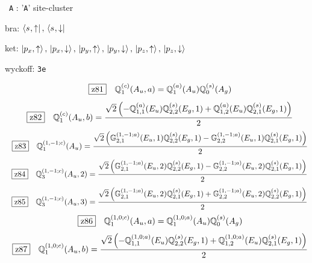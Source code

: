 \documentclass[fleqn,10pt,landscape]{jsarticle}
\begin{document}
\noindent\textbullet\, \texttt{A} : '\texttt{A}' site-cluster

\noindent\quad * bra: $\bra{s_{},\uparrow},\, \bra{s_{},\downarrow}$

\noindent\quad * ket: $\ket{p_{x},\uparrow},\, \ket{p_{x},\downarrow},\, \ket{p_{y},\uparrow},\, \ket{p_{y},\downarrow},\, \ket{p_{z},\uparrow},\, \ket{p_{z},\downarrow}$

\noindent\quad * wyckoff: \texttt{3e}

\begin{dmath*}
\hspace*{3mm}\fbox{z81}\quad \mathbb{Q}_{1}^{(c)}(A_{u},a)=\mathbb{Q}_{1}^{(a)}(A_{u}) \mathbb{Q}_{0}^{(s)}(A_{g})
\end{dmath*}
\begin{dmath*}
\hspace*{3mm}\fbox{z82}\quad \mathbb{Q}_{1}^{(c)}(A_{u},b)=\frac{\sqrt{2} \left(- \mathbb{Q}_{1,1}^{(a)}(E_{u}) \mathbb{Q}_{2,2}^{(s)}(E_{g},1) + \mathbb{Q}_{1,2}^{(a)}(E_{u}) \mathbb{Q}_{2,1}^{(s)}(E_{g},1)\right)}{2}
\end{dmath*}
\begin{dmath*}
\hspace*{3mm}\fbox{z83}\quad \mathbb{Q}_{1}^{(1,-1;c)}(A_{u})=\frac{\sqrt{2} \left(\mathbb{G}_{2,1}^{(1,-1;a)}(E_{u},1) \mathbb{Q}_{2,2}^{(s)}(E_{g},1) - \mathbb{G}_{2,2}^{(1,-1;a)}(E_{u},1) \mathbb{Q}_{2,1}^{(s)}(E_{g},1)\right)}{2}
\end{dmath*}
\begin{dmath*}
\hspace*{3mm}\fbox{z84}\quad \mathbb{Q}_{3}^{(1,-1;c)}(A_{u},2)=\frac{\sqrt{2} \left(\mathbb{G}_{2,1}^{(1,-1;a)}(E_{u},2) \mathbb{Q}_{2,2}^{(s)}(E_{g},1) - \mathbb{G}_{2,2}^{(1,-1;a)}(E_{u},2) \mathbb{Q}_{2,1}^{(s)}(E_{g},1)\right)}{2}
\end{dmath*}
\begin{dmath*}
\hspace*{3mm}\fbox{z85}\quad \mathbb{Q}_{3}^{(1,-1;c)}(A_{u},3)=\frac{\sqrt{2} \left(\mathbb{G}_{2,1}^{(1,-1;a)}(E_{u},2) \mathbb{Q}_{2,1}^{(s)}(E_{g},1) + \mathbb{G}_{2,2}^{(1,-1;a)}(E_{u},2) \mathbb{Q}_{2,2}^{(s)}(E_{g},1)\right)}{2}
\end{dmath*}
\begin{dmath*}
\hspace*{3mm}\fbox{z86}\quad \mathbb{Q}_{1}^{(1,0;c)}(A_{u},a)=\mathbb{Q}_{1}^{(1,0;a)}(A_{u}) \mathbb{Q}_{0}^{(s)}(A_{g})
\end{dmath*}
\begin{dmath*}
\hspace*{3mm}\fbox{z87}\quad \mathbb{Q}_{1}^{(1,0;c)}(A_{u},b)=\frac{\sqrt{2} \left(- \mathbb{Q}_{1,1}^{(1,0;a)}(E_{u}) \mathbb{Q}_{2,2}^{(s)}(E_{g},1) + \mathbb{Q}_{1,2}^{(1,0;a)}(E_{u}) \mathbb{Q}_{2,1}^{(s)}(E_{g},1)\right)}{2}
\end{dmath*}
\end{document}
